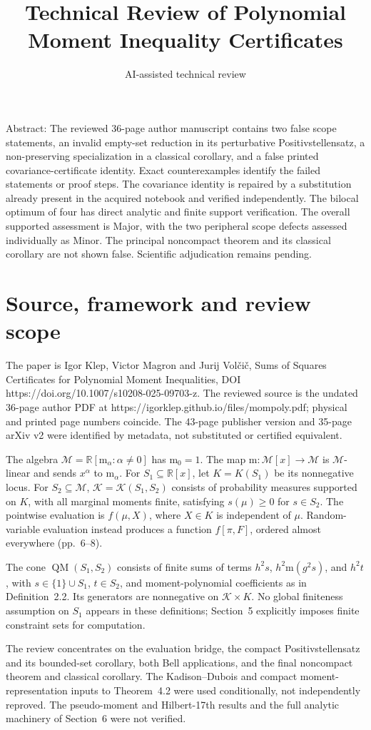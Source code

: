 \documentclass[10pt]{article}
\title{Technical Review of Polynomial
Moment Inequality Certificates}
\author{AI-assisted technical review}
\date{}
\begin{document}
\maketitle
Abstract: The reviewed 36-page author manuscript contains two false scope statements, an invalid empty-set reduction in its perturbative Positivstellensatz, a non-preserving specialization in a classical corollary, and a false printed covariance-certificate identity. Exact counterexamples identify the failed statements or proof steps. The covariance identity is repaired by a substitution already present in the acquired notebook and verified independently. The bilocal optimum of four has direct analytic and finite support verification. The overall supported assessment is Major, with the two peripheral scope defects assessed individually as Minor. The principal noncompact theorem and its classical corollary are not shown false. Scientific adjudication remains pending.\par
\section*{Source, framework and review scope}
The paper is Igor Klep, Victor Magron and Jurij Volčič, Sums of Squares Certificates for Polynomial Moment Inequalities, DOI https://doi.org/10.1007/s10208-025-09703-z. The reviewed source is the undated 36-page author PDF at https://igorklep.github.io/files/mompoly.pdf; physical and printed page numbers coincide. The 43-page publisher version and 35-page arXiv v2 were identified by metadata, not substituted or certified equivalent.\par
The algebra \(\mathcal M=\mathbb R[\mathrm{m}_\alpha:\alpha\ne0]\) has \(\mathrm{m}_0=1\). The map \(\mathrm{m}:\mathcal M[x]\to\mathcal M\) is \(\mathcal M\)-linear and sends \(x^\alpha\) to \(\mathrm{m}_\alpha\). For \(S_1\subseteq\mathbb R[x]\), let \(K=K(S_1)\) be its nonnegative locus. For \(S_2\subseteq\mathcal M\), \(\mathcal K=\mathcal K(S_1,S_2)\) consists of probability measures supported on \(K\), with all marginal moments finite, satisfying \(s(\mu)\ge0\) for \(s\in S_2\). The pointwise evaluation is \(f(\mu,X)\), where \(X\in K\) is independent of \(\mu\). Random-variable evaluation instead produces a function \(f[\pi,F]\), ordered almost everywhere (pp. 6–8).\par
The cone \(\operatorname{QM}(S_1,S_2)\) consists of finite sums of terms \(h^2s\), \(h^2\mathrm{m}(g^2s)\), and \(h^2t\), with \(s\in\{1\}\cup S_1\), \(t\in S_2\), and moment-polynomial coefficients as in Definition 2.2. Its generators are nonnegative on \(\mathcal K\times K\). No global finiteness assumption on \(S_1\) appears in these definitions; Section 5 explicitly imposes finite constraint sets for computation.\par
The review concentrates on the evaluation bridge, the compact Positivstellensatz and its bounded-set corollary, both Bell applications, and the final noncompact theorem and classical corollary. The Kadison–Dubois and compact moment-representation inputs to Theorem 4.2 were used conditionally, not independently reproved. The pseudo-moment and Hilbert-17th results and the full analytic machinery of Section 6 were not verified.\par
\end{document}
